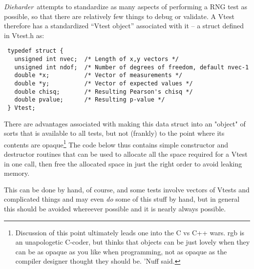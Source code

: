 \documentclass[12pt]{book}
\newcommand{\die}{\emph{Dieharder}\ }
\begin{document}
\die attempts to standardize as many aspects of performing a RNG test as
possible, so that there are relatively few things to debug or validate.
A Vtest therefore has a standardized ``Vtest object'' associated with it
-- a struct defined in Vtest.h as:

\begin{verbatim}
 typedef struct {
   unsigned int nvec;  /* Length of x,y vectors */
   unsigned int ndof;  /* Number of degrees of freedom, default nvec-1
   double *x;          /* Vector of measurements */
   double *y;          /* Vector of expected values */
   double chisq;       /* Resulting Pearson's chisq */
   double pvalue;      /* Resulting p-value */
 } Vtest;
\end{verbatim}

There are advantages associated with making this data struct into an
"object" of sorts that is available to all tests, but not (frankly) to
the point where its contents are opaque\footnote{Discussion of this
point ultimately leads one into the C vs C++ wars.  rgb is an
unapologetic C-coder, but thinks that objects can be just lovely when
they can be as opaque as you like when programming, not as opaque as the
compiler designer thought they should be.  'Nuff said.} The code below
thus contains simple constructor and destructor routines that can be
used to allocate all the space required for a Vtest in one call, then
free the allocated space in just the right order to avoid leaking
memory.  

This can be done by hand, of course, and some tests involve vectors of
Vtests and complicated things and may even {\em do} some of this stuff
by hand, but in general this should be avoided whereever possible and it
is nearly always possible.
\end{document}
